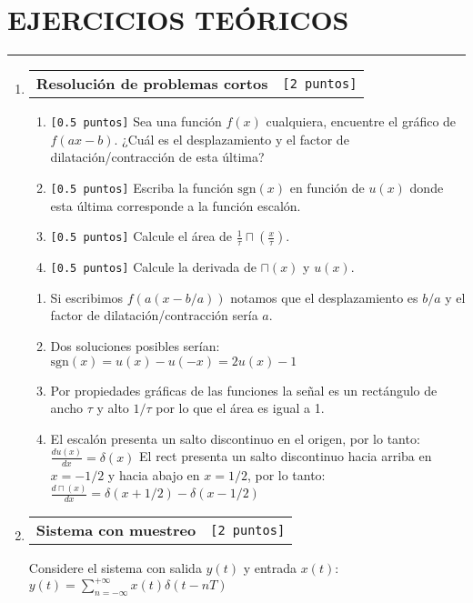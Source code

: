 \documentclass[letterpaper, 12pt]{article}
\makeatletter
\newcommand{\puntos}[1]{\texttt{[#1 puntos]}}
\newenvironment{ejerciciosteoricos}{%
  \clearpage
  \section*{EJERCICIOS TEÓRICOS}
  \hrule
  \vspace{0.5cm}
  \begin{enumerate}[leftmargin=20pt, itemsep=15pt]
}{%
  \end{enumerate}
}
\newenvironment{ejercicio}[2][]{%
  \item
  \noindent\begin{tabularx}{\linewidth}{@{} X r @{}}
    \textbf{#1} & \puntos{#2}
  \end{tabularx}
  
  \begin{tcolorbox}[
    enhanced,
    breakable,
    colback=white,
    colframe=pucgray,
    boxrule=1pt,
    rounded corners=5pt,
    left=10pt,
    right=10pt,
    top=8pt,
    bottom=8pt
  ]
}{%
  \end{tcolorbox}
  \vspace{0.5cm}
}
\newif\ifanswers
\newenvironment{solucion}{%
  \ifanswers
    \begin{tcolorbox}[
      enhanced,
      breakable,
      colback=black!5,
      colframe=black!50,
      boxrule=1pt,
      rounded corners=5pt,
      left=8pt,
      right=8pt,
      top=8pt,
      bottom=8pt,
      title={\textbf{SOLUCIÓN}},
      fonttitle=\bfseries
    ]
  \fi
}{%
  \ifanswers
    \end{tcolorbox}
  \fi
}
\makeatother
\begin{document}
\begin{ejerciciosteoricos}

\begin{ejercicio}[Resolución de problemas cortos]{2}
  \begin{enumerate}
    \item \puntos{0.5} Sea una función $f(x)$ cualquiera, encuentre el gráfico de $f(ax-b)$. ¿Cuál es el desplazamiento y el factor de dilatación/contracción de esta última?
    
    \item \puntos{0.5} Escriba la función $\text{sgn}(x)$ en función de $u(x)$ donde esta última corresponde a la función escalón.
    
    \item \puntos{0.5} Calcule el área de $\frac{1}{\tau}\sqcap\left(\frac{x}{\tau}\right)$.
    
    \item \puntos{0.5} Calcule la derivada de $\sqcap(x)$ y $u(x)$.
  \end{enumerate}
  
  \begin{solucion}
    \begin{enumerate}
      \item Si escribimos $f(a(x-b/a))$ notamos que el desplazamiento es $b/a$ y el factor de dilatación/contracción sería $a$.
      
      \item Dos soluciones posibles serían: 
      $\text{sgn}(x) = u(x)-u(-x) = 2u(x)-1$
      
      \item Por propiedades gráficas de las funciones la señal es un rectángulo de ancho $\tau$ y alto $1/\tau$ por lo que el área es igual a 1.
      
      \item El escalón presenta un salto discontinuo en el origen, por lo tanto:
      $\frac{d u(x)}{dx} = \delta(x)$
      El rect presenta un salto discontinuo hacia arriba en $x=-1/2$ y hacia abajo en $x= 1/2$, por lo tanto:
      $\frac{d \sqcap(x)}{dx} = \delta(x+1/2)-\delta(x-1/2)$
    \end{enumerate}
  \end{solucion}
\end{ejercicio}

\begin{ejercicio}[Sistema con muestreo]{2}
  Considere el sistema con salida $y(t)$ y entrada $x(t)$:
  $y(t) = \sum_{n = -\infty}^{+ \infty}x(t) \delta (t-nT)$
  

\end{ejercicio}
\end{ejerciciosteoricos}
\end{document}
